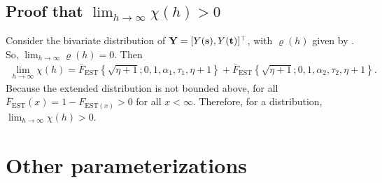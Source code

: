 \subsection*{Proof that $\displaystyle \lim_{h \rightarrow \infty} \chi(h) > 0$}

Consider the bivariate distribution of $\mathbf{Y} = [Y(\mathbf{s}), Y(\mathbf{t})]^\top$, with $\varrho(h)$ given by .
So, $\displaystyle \lim_{h \rightarrow \infty} \varrho(h) = 0$.
Then
\begin{align}
  \lim_{h \rightarrow \infty} \chi(h) = \bar{F}_{\text{EST}}\left\{ \sqrt{\eta + 1}; 0, 1, \alpha_1, \tau_1, \eta + 1 \right\} + \bar{F}_{\text{EST}}\left\{ \sqrt{\eta + 1}; 0, 1, \alpha_2, \tau_2, \eta + 1 \right\}.
\end{align}
Because the extended \skewt{} distribution is not bounded above, for all $\bar{F}_{\text{EST}}(x) = 1 - F_{\text{EST} (x)} > 0$ for all $x < \infty$.
Therefore, for a \skewt{} distribution, $\displaystyle \lim_{h \rightarrow \infty} \chi(h) > 0$.


\section{Other \skewt{} parameterizations}

